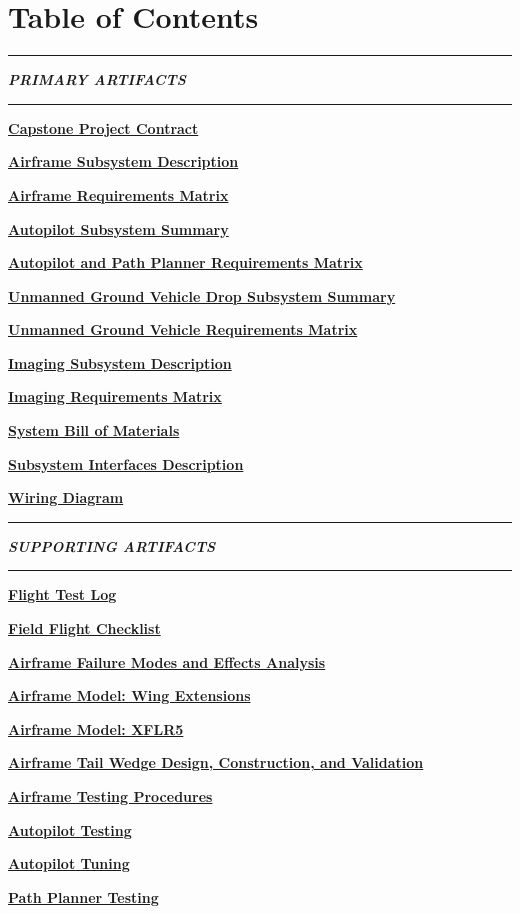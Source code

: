 \documentclass[]{article}
\newcommand{\pdflink}[2]{
\hyperlink{#1.1}{\textbf{#2}}
}
\begin{document}



\section*{Table of Contents}

\hrule

\textbf{\textit{PRIMARY ARTIFACTS}}

\hrule

\pdflink{proj_cont}{Capstone Project Contract}

\pdflink{add}{Airframe Subsystem Description}

\pdflink{arq}{Airframe Requirements Matrix}

\pdflink{auto}{Autopilot Subsystem Summary}

\pdflink{autorq}{Autopilot and Path Planner Requirements Matrix}

\pdflink{ugvdsscd}{Unmanned Ground Vehicle Drop Subsystem Summary}

\pdflink{ugvrm}{Unmanned Ground Vehicle Requirements Matrix}

\pdflink{isd}{Imaging Subsystem Description}

\pdflink{irm}{Imaging Requirements Matrix}

\pdflink{abm}{System Bill of Materials}

\pdflink{sid}{Subsystem Interfaces Description}

\pdflink{wd}{Wiring Diagram}

\hrule

\textbf{\textit{SUPPORTING ARTIFACTS}}

\hrule

\pdflink{fl}{Flight Test Log}

\pdflink{ffcl}{Field Flight Checklist}

\pdflink{afmea}{Airframe Failure Modes and Effects Analysis}

\pdflink{amwe}{Airframe Model: Wing Extensions}

\pdflink{amxflr}{Airframe Model: XFLR5}

\pdflink{atwt}{Airframe Tail Wedge Design, Construction, and Validation}

\pdflink{atap}{Airframe Testing Procedures}

\pdflink{atest}{Autopilot Testing}

\pdflink{atune}{Autopilot Tuning}

\pdflink{ppt}{Path Planner Testing}
\end{document}
